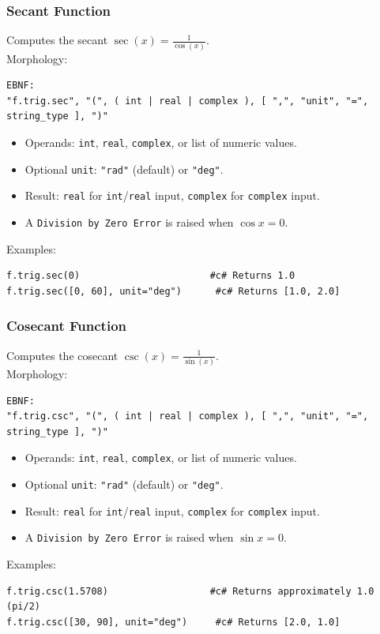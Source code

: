 \subsubsection{Secant Function}
Computes the secant $\sec(x) = \frac{1}{\cos(x)}$. \\
Morphology:
\begin{verbatim}
EBNF:
"f.trig.sec", "(", ( int | real | complex ), [ ",", "unit", "=", string_type ], ")"
\end{verbatim}
\begin{itemize}
\item Operands: \texttt{int}, \texttt{real}, \texttt{complex}, or list of numeric values.
\item Optional \texttt{unit}: \texttt{"rad"} (default) or \texttt{"deg"}.
\item Result: \texttt{real} for \texttt{int}/\texttt{real} input, \texttt{complex} for \texttt{complex} input.
\item A \texttt{Division by Zero Error} is raised when $\cos x = 0$.
\end{itemize}
Examples:
\begin{verbatim}
f.trig.sec(0)                       #c# Returns 1.0
f.trig.sec([0, 60], unit="deg")      #c# Returns [1.0, 2.0]
\end{verbatim}

\subsubsection{Cosecant Function}
Computes the cosecant $\csc(x) = \frac{1}{\sin(x)}$. \\
Morphology:
\begin{verbatim}
EBNF:
"f.trig.csc", "(", ( int | real | complex ), [ ",", "unit", "=", string_type ], ")"
\end{verbatim}
\begin{itemize}
\item Operands: \texttt{int}, \texttt{real}, \texttt{complex}, or list of numeric values.
\item Optional \texttt{unit}: \texttt{"rad"} (default) or \texttt{"deg"}.
\item Result: \texttt{real} for \texttt{int}/\texttt{real} input, \texttt{complex} for \texttt{complex} input.
\item A \texttt{Division by Zero Error} is raised when $\sin x = 0$.
\end{itemize}
Examples:
\begin{verbatim}
f.trig.csc(1.5708)                  #c# Returns approximately 1.0  (pi/2)
f.trig.csc([30, 90], unit="deg")     #c# Returns [2.0, 1.0]
\end{verbatim}

